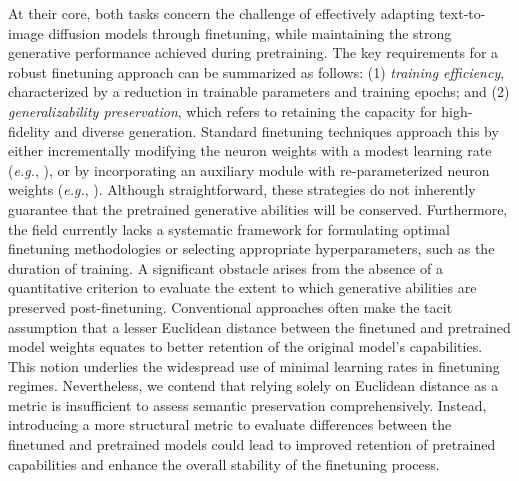 At their core, both tasks concern the challenge of effectively adapting text-to-image diffusion models through finetuning, while maintaining the strong generative performance achieved during pretraining. The key requirements for a robust finetuning approach can be summarized as follows: (1) \emph{training efficiency}, characterized by a reduction in trainable parameters and training epochs; and (2) \emph{generalizability preservation}, which refers to retaining the capacity for high-fidelity and diverse generation. Standard finetuning techniques approach this by either incrementally modifying the neuron weights with a modest learning rate (\emph{e.g.}, \cite{ruiz2023dreambooth}), or by incorporating an auxiliary module with re-parameterized neuron weights (\emph{e.g.}, \cite{hulora2022,zhang2023adding}). Although straightforward, these strategies do not inherently guarantee that the pretrained generative abilities will be conserved. Furthermore, the field currently lacks a systematic framework for formulating optimal finetuning methodologies or selecting appropriate hyperparameters, such as the duration of training. A significant obstacle arises from the absence of a quantitative criterion to evaluate the extent to which generative abilities are preserved post-finetuning. Conventional approaches often make the tacit assumption that a lesser Euclidean distance between the finetuned and pretrained model weights equates to better retention of the original model's capabilities. This notion underlies the widespread use of minimal learning rates in finetuning regimes. Nevertheless, we contend that relying solely on Euclidean distance as a metric is insufficient to assess semantic preservation comprehensively. Instead, introducing a more structural metric to evaluate differences between the finetuned and pretrained models could lead to improved retention of pretrained capabilities and enhance the overall stability of the finetuning process.

